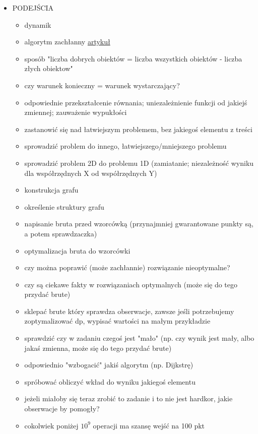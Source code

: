 \documentclass[15pt]{article}
\begin{document}
\begin{itemize}
    \newpage
    \item PODEJŚCIA
    \begin{itemize}
        \item dynamik
        \item algorytm zachłanny \href{http://kompendium.meetit.pl/kurs#meth2}{artykuł}
        \item sposób "liczba dobrych obiektów = liczba wszystkich obiektów - liczba złych obiektow"
        \item czy warunek konieczny = warunek wystarczający?
        \item odpowiednie przekształcenie równania; uniezależnienie funkcji od jakiejś zmiennej; zauważenie wypukłości
        \item zastanowić się nad łatwiejszym problemem, bez jakiegoś elementu z treści
        \item sprowadzić problem do innego, łatwiejszego/mniejszego problemu
        \item sprowadzić problem 2D do problemu 1D (zamiatanie; niezależność wyniku dla współrzędnych X od współrzędnych Y)
        \item konstrukcja grafu
        \item określenie struktury grafu
        \item napisanie bruta przed wzorcówką (przynajmniej gwarantowane punkty są, a potem sprawdzaczka)
        \item optymalizacja bruta do wzorcówki
        \item czy można poprawić (może zachłannie) rozwiązanie nieoptymalne?
        \item czy są ciekawe fakty w rozwiązaniach optymalnych (może się do tego przydać brute)
        \item sklepać brute który sprawdza obserwacje, zawsze jeśli potrzebujemy zoptymalizować dp, wypisać wartości na małym przykładzie
        \item sprawdzić czy w zadaniu czegoś jest "mało" (np. czy wynik jest mały, albo jakaś zmienna, może się do tego przydać brute)
        \item odpowiednio "wzbogacić" jakiś algorytm (np. Dijkstrę)
        \item spróbować obliczyć wkład do wyniku jakiegoś elementu
        \item jeżeli miałoby się teraz zrobić to zadanie i to nie jest hardkor, jakie obserwacje by pomogły?
        \item cokolwiek poniżej $10^9$ operacji ma szansę wejść na 100 pkt

\end{itemize}
\end{itemize}
\end{document}

